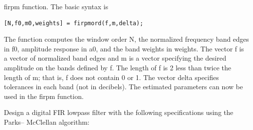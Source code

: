 \documentclass{article}
\begin{document}
firpm function. The basic syntax is
\begin{lstlisting}
[N,f0,m0,weights] = firpmord(f,m,delta);    
\end{lstlisting}
The function computes the window order N, the normalized frequency
band edges in f0, amplitude response in a0, and the band weights in
weights. The vector f is a vector of normalized band edges and m is a
vector specifying the desired amplitude on the bands defined by f. The
length of f is 2 less than twice the length of m; that is, f does not contain 0
or 1. The vector delta specifies tolerances in each band (not in decibels).
The estimated parameters can now be used in the firpm function.
\vspace{1em}

Design a digital FIR lowpass filter with the following specifications using the Parks–
McClellan algorithm:
\vspace{1em}
\end{document}
